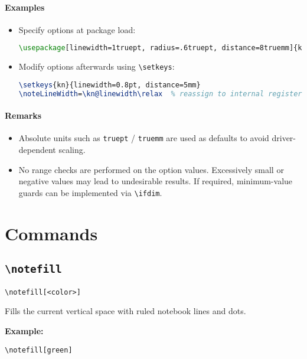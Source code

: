 \documentclass[a4paper,12pt]{article}
\begin{document}
\paragraph{Examples}
\begin{itemize}
  \item Specify options at package load:
\begin{lstlisting}[language=TeX]
\usepackage[linewidth=1truept, radius=.6truept, distance=8truemm]{keisennote}
\end{lstlisting}
  \item Modify options afterwards using \verb|\setkeys|:
\begin{lstlisting}[language=TeX]
\setkeys{kn}{linewidth=0.8pt, distance=5mm}
\noteLineWidth=\kn@linewidth\relax  % reassign to internal registers if needed
\end{lstlisting}
\end{itemize}

\paragraph{Remarks}
\begin{itemize}
  \item Absolute units such as \texttt{truept} / \texttt{truemm} are used as defaults
        to avoid driver-dependent scaling.
  \item No range checks are performed on the option values.
        Excessively small or negative values may lead to undesirable results.
        If required, minimum-value guards can be implemented via \verb|\ifdim|.
\end{itemize}

\section{Commands}

\subsection{\texttt{\textbackslash notefill}}
\begin{verbatim}
\notefill[<color>]
\end{verbatim}

Fills the current vertical space with ruled notebook lines and dots.

\textbf{Example:}
\begin{verbatim}
\notefill[green]
\end{verbatim}
\end{document}
